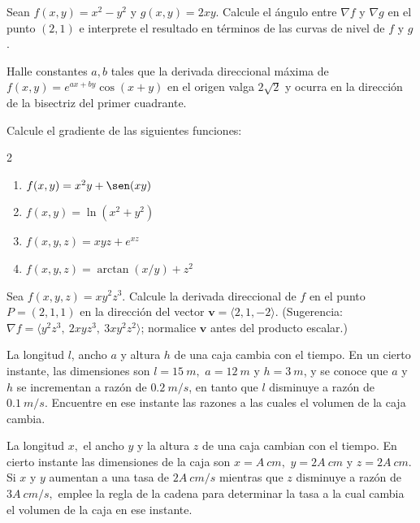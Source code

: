 \begin{prob}
Sean $f(x,y)=x^2-y^2$ y $g(x,y)=2xy$. Calcule el ángulo entre $\nabla f$ y
$\nabla g$ en el punto $(2,1)$ e interprete el resultado en términos de las
curvas de nivel de $f$ y $g$.
\end{prob}

\begin{prob}[Desafiante]
Halle constantes $a,b$ tales que la derivada direccional máxima de
$f(x,y)=e^{ax+by}\cos(x+y)$ en el origen valga $2\sqrt2$ y ocurra en la
dirección de la bisectriz del primer cuadrante.
\end{prob}

\begin{prob}
Calcule el gradiente de las siguientes funciones:
\begin{multicols}{2}
\begin{enumerate}
    \item $f(x,y) = x^2 y + \sen(xy)$
    \item $f(x,y) = \ln(x^2 + y^2)$
    \item $f(x,y,z) = xyz + e^{xz}$
    \item $f(x,y,z) = \arctan(x/y) + z^2$
\end{enumerate}
\end{multicols}
\end{prob}

\begin{prob}
Sea $f(x,y,z)=xy^2z^3$. Calcule la derivada direccional de $f$ en el punto
$P=(2,1,1)$ en la dirección del vector $\mathbf v=\langle 2,1,-2\rangle$.
(Sugerencia: $\nabla f=\langle y^2z^3,\ 2xyz^3,\ 3xy^2z^2\rangle$; normalice
$\mathbf v$ antes del producto escalar.)
\end{prob}


\begin{prob}
La longitud $l$, ancho $a$ y altura $h$ de una caja cambia con el tiempo. En un cierto instante, las dimensiones son $l= 15\ m,$ $a=12\ m$ y $h= 3\ m$, y se conoce que $a$ y $h$ se incrementan a razón de $0.2\ m/s$, en tanto que $l$ disminuye a razón de $0.1\ m/s.$ Encuentre en ese instante las razones a las cuales el volumen de la caja cambia.
\end{prob}

\begin{prob}
La longitud $x,$ el ancho $y$ y la altura $z$ de una caja cambian con el tiempo. En cierto instante las dimensiones de la caja son $x=A\ cm,$ $y=2A\ cm$ y $z= 2A\ cm.$ Si $x$ y $y$ aumentan a una tasa de $2A\ cm/s$ mientras que $z$ disminuye a razón de $3A\ cm/s,$ emplee la regla de la cadena para determinar la tasa a la cual cambia el volumen de la caja en ese instante.
\end{prob}

